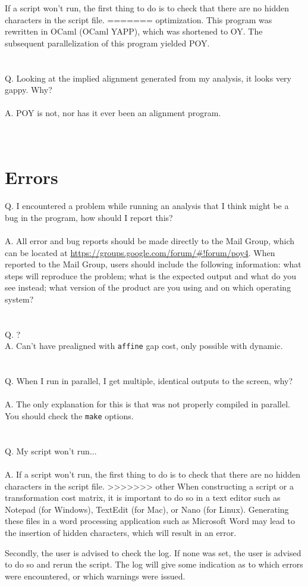 {If a script won't run, the first thing to do is to check that there are no hidden characters in the script file.
=======
optimization.  This program was rewritten in OCaml (OCaml YAPP), which was shortened to OY.  
The subsequent parallelization of this program yielded POY.\\
\\
\\
Q. Looking at the implied alignment generated from my \poy analysis, it looks very gappy.  Why?\\
\\
A. POY is not, nor has it ever been an alignment program.\\
\\
\\
\section{Errors}
Q. I encountered a problem while running an analysis that I think might be a bug in the program, how should 
I report this?\\
\\
A. All error and bug reports should be made directly to the \poy Mail Group, which can be located at
\url{https://groups.google.com/forum/#!forum/poy4}. When reported to the Mail Group, users
should include the following information: what steps will reproduce the problem; what is the expected output and 
what do you see instead;  what version of the product are you using and on which operating system?\\
\\
\\
Q. ?
\\
A. Can't have prealigned with \texttt{affine} gap cost, only possible with dynamic.\\
\\
\\
Q. When I run \poy in parallel, I get multiple, identical outputs to the screen, why?\\
\\
A. The only explanation for this is that \poy was not properly compiled in parallel. You should check the \texttt{make}
options.\\
\\
\\
Q. My script won't run...\\
\\
A. If a script won't run, the first thing to do is to check that there are no hidden characters in the script file.
>>>>>>> other
When constructing a script or a transformation cost matrix, it is important to do so in a text editor 
such as Notepad (for Windows), TextEdit (for Mac), or Nano (for Linux). Generating these files in 
a word processing application such as Microsoft Word may lead to the insertion of hidden 
characters, which will result in an error.

Secondly, the user is advised to check the log.  If none was set, the user is advised to do so and rerun the script.
The log will give some indication as to which errors were encountered, or which warnings were issued.}


